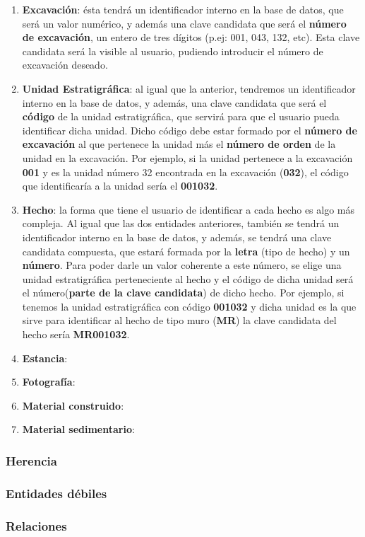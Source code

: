     \begin{enumerate}
        \item \textbf{Excavación}: ésta tendrá un identificador interno en la base de
        datos, que será un valor numérico, y además una clave candidata que será el
        \textbf{número de excavación}, un entero de tres dígitos (p.ej: 001, 043, 132, etc).
        Esta clave candidata será la visible al usuario, pudiendo introducir el número de
        excavación deseado.

        \item \textbf{Unidad Estratigráfica}: al igual que la anterior, tendremos un
        identificador interno en la base de datos, y además, una clave candidata que será el
        \textbf{código} de la unidad estratigráfica, que servirá para que el usuario pueda
        identificar dicha unidad. Dicho código debe estar formado por el \textbf{número de
        excavación} al que pertenece la unidad más el \textbf{número de orden} de la
        unidad en la excavación. Por ejemplo, si la unidad pertenece a la excavación
        \textbf{001} y es la unidad número 32 encontrada en la excavación (\textbf{032}), el
        código que identificaría a la unidad sería el \textbf{001032}.

        \item \textbf{Hecho}: la forma que tiene el usuario de identificar a cada hecho es algo
        más compleja. Al igual que las dos entidades anteriores, también se tendrá un
        identificador interno en la base de datos, y además, se tendrá una clave candidata
        compuesta, que estará formada por la \textbf{letra} (tipo de hecho) y un
        \textbf{número}. Para poder darle un valor coherente a este número, se elige una
        unidad estratigráfica perteneciente al hecho y el código de dicha unidad será el
        número(\textbf{parte de la clave candidata}) de dicho hecho. Por ejemplo, si tenemos
        la unidad estratigráfica con código \textbf{001032} y dicha unidad es la que sirve
        para identificar al hecho de tipo muro (\textbf{MR}) la clave candidata del hecho
        sería \textbf{MR001032}.

        \item \textbf{Estancia}:
        
        \item \textbf{Fotografía}:
        
        \item \textbf{Material construido}:
        
        \item \textbf{Material sedimentario}:
        
    \end{enumerate}

    \subsubsection{Herencia}
    \subsubsection{Entidades débiles}
    \subsubsection{Relaciones}
